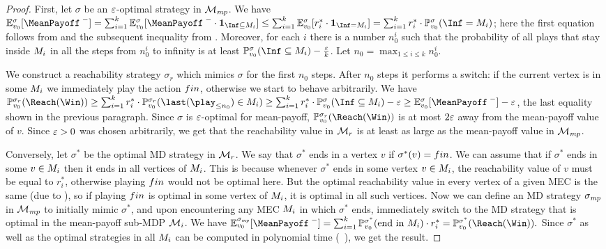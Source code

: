 \begin{proof}
First, let $\sigma$ be an $\varepsilon$-optimal strategy in $\mathcal{M}_{\mathit{mp}}$. 
We have $\expv^\sigma_{\vinit}[\MeanPayoffInf] = \sum_{i=1}^k\expv^\sigma_{\vinit}[\MeanPayoffInf\cdot \indicator{\Inf\subseteq\mec_i}] \leq \sum_{i=1}^k \expv^\sigma_{\vinit}[r_i^*\cdot \indicator{\Inf=\mec_i}] = \sum_{i=1}^k r_i^* \cdot \probm_{\vinit}^\sigma(\Inf=\mec_i) $; here the first equation follows from  and the subsequent inequality from . Moreover, for each $i$ there is a number $n_0^i$ such that the probability of all plays that stay inside $M_i$ in all the steps from $n_0^i$ to infinity is at least $\probm_{\vinit}^\sigma(\Inf\subseteq\mec_i) - \frac{\eps}{k} $. Let $n_0 = \max_{1\leq i \leq k} n^i_0$.

We construct a reachability strategy $\sigma_r$ which mimics $\sigma$ for the first $n_0$ steps. After $n_0$ steps it performs a switch: if the current vertex is in some $M_i$ we immediately play the action $fin$, otherwise we start to behave arbitrarily. We have $\probm_{\vinit}^{\sigma_r}(\Reach(\Win)) \geq \sum_{i=1}^{k} r_i^* \cdot \probm_{\vinit}^{\sigma_r}(\last(\play_{\leq n_0}) \in \mec_i ) \geq \sum_{i=1}^k r_i^* \cdot \probm_{\vinit}^\sigma(\Inf\subseteq\mec_i) - \eps \geq \expv^\sigma_{\vinit}[\MeanPayoffInf] -\eps$, the last equality shown in the previous paragraph. Since $\sigma$ is $\varepsilon$-optimal for mean-payoff, $\probm_{\vinit}^{\sigma_r}(\Reach(\Win))$ is at most $2\varepsilon$ away from the mean-payoff value of $ v $. Since $\varepsilon>0$ was chosen arbitrarily, we get that the reachability value in $\mathcal{M}_{r}$ is at least as large as the mean-payoff value in $\mathcal{M}_{\mathit{mp}}$.

Conversely, let $\sigma^*$ be the optimal MD strategy in $\mathcal{M}_r$. We say that $\sigma^*$ ends in a vertex $v$ if $\sigma^*(v)=fin$. We can assume that if $\sigma^*$ ends in some $v \in M_i$ then it ends in all vertices of $M_i$. This is because whenever $\sigma^*$ ends in some vertex $v \in M_i$, the reachability value of $v$ must be equal to $r^*_i$, otherwise playing $fin$ would not be optimal here. But the optimal reachability value in every vertex of a given MEC is the same (due to ), so if playing $fin$ is optimal in some vertex of $M_i$, it is optimal in all such vertices. Now we can define an MD strategy $\sigma_{\mathit{mp}}$ in $\mathcal{M}_{\mathit{mp}}$ to initially mimic $\sigma^*$, and upon encountering any MEC $M_i$ in which $\sigma^*$ ends, immediately switch to the MD strategy that is optimal in the mean-payoff sub-MDP $\mathcal{M}_i$. We have $\expv^{\sigma_{\smallmp}}_{\vinit}[\MeanPayoffInf]  =  \sum_{i=1}^{k} \probm^{\sigma^*}_{\vinit}(\text{end in }\mec_i)\cdot r^*_i = \probm^{\sigma^*}_{\vinit} (\Reach(\Win)). $ Since $\sigma^*$ as well as the optimal strategies in all $M_i$ can be computed in polynomial time (~), we get the result.
%
\end{proof}
